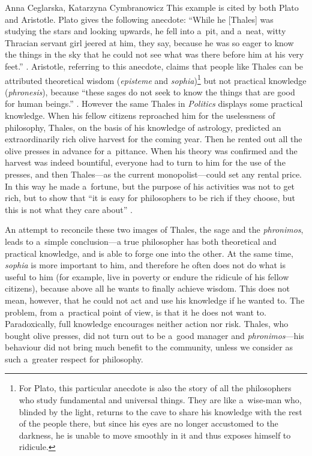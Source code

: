 \begin{artengenv2auth}{Anna Ceglarska, Katarzyna Cymbranowicz}
This example is cited by both Plato and Aristotle. Plato gives the following anecdote: ``While he [Thales] was studying the stars and looking upwards, he fell into a~pit, and a~neat, witty Thracian servant girl jeered at him, they say, because he was so eager to know the things in the sky that he could not see what was there before him at his very feet.'' 
\parencite[][174a]{plato_plato_1921}. %
 Aristotle, referring to this anecdote, claims that people like Thales can be attributed theoretical wisdom (\textit{episteme} and \textit{sophia})\footnote{For Plato, this particular anecdote is also the story of all the philosophers who study fundamental and universal things. They are like a~wise-man who, blinded by the light, returns to the cave to share his knowledge with the rest of the people there, but since his eyes are no longer accustomed to the darkness, he is unable to move smoothly in it and thus exposes himself to ridicule.} but not practical knowledge (\textit{phronesis}), because ``these sages do not seek to know the things that are good for human beings.'' 
\parencite[][]{rackham_nicomachean_1934}. %
 However the same Thales in \textit{Politics} displays some practical knowledge. When his fellow citizens reproached him for the uselessness of philosophy, Thales, on the basis of his knowledge of astrology, predicted an extraordinarily rich olive harvest for the coming year. Then he rented out all the olive presses in advance for a~pittance. When his theory was confirmed and the harvest was indeed bountiful, everyone had to turn to him for the use of the presses, and then Thales---as the current monopolist---could set any rental price. In this way he made a~fortune, but the purpose of his activities was not to get rich, but to show that ``it is easy for philosophers to be rich if they choose, but this is not what they care about'' 
\parencite[][1.1259a]{aristotle_politics_1944}.%




An attempt to reconcile these two images of Thales, the sage and the \textit{phronimos}, leads to a~simple conclusion---a true philosopher has both theoretical and practical knowledge, and is able to forge one into the other. At the same time, \textit{sophia} is more important to him, and therefore he often does not do what is useful to him (for example, live in poverty or endure the ridicule of his fellow citizens), because above all he wants to finally achieve wisdom. This does not mean, however, that he could not act and use his knowledge if he wanted to. The problem, from a~practical point of view, is that it he does not want to. Paradoxically, full knowledge encourages neither action nor risk. Thales, who bought olive presses, did not turn out to be a~good manager and \textit{phronimos}---his behaviour did not bring much benefit to the community, unless we consider as such a~greater respect for philosophy.




\end{artengenv2auth}
